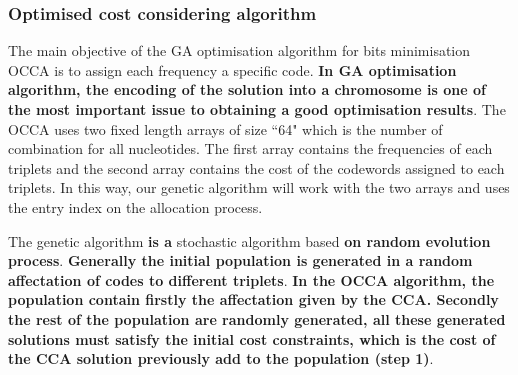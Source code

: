 \documentclass[preprint,12pt]{elsarticle}
\begin{document}
\subsubsection{Optimised cost considering algorithm}
The main objective of the GA optimisation algorithm for bits minimisation OCCA is to assign each frequency a specific code. \textbf{In GA optimisation algorithm, the encoding of the solution into a chromosome is one of the most important issue to obtaining a good optimisation results}. The OCCA uses two fixed length arrays of size ``64" which is the number of combination for all nucleotides. The first array contains the frequencies of each triplets and the second array contains the cost of the codewords assigned to each triplets. In this way, our genetic algorithm will work with the two arrays and uses the entry index on the allocation process.

The genetic algorithm\textbf{ is a }stochastic algorithm based \textbf{on random evolution process}. \textbf{Generally the initial population is generated in a random affectation of codes to different triplets}. \textbf{In the OCCA algorithm, the population contain firstly the affectation given by the CCA. Secondly the rest of the population are randomly generated, all these generated solutions must satisfy the initial cost constraints, which is the cost of the CCA solution previously add to the population (step 1)}. 
\end{document}
